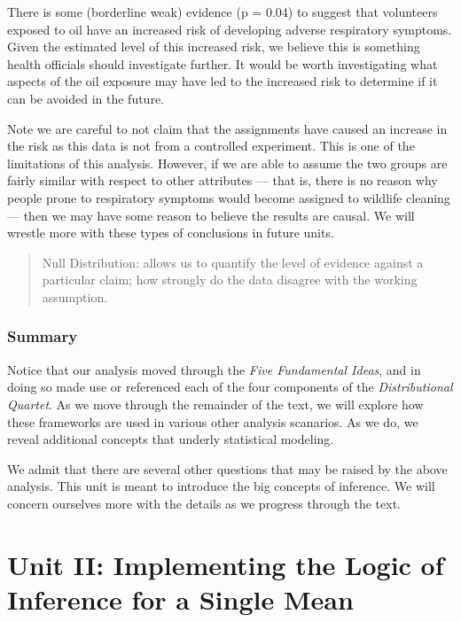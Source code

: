\documentclass[]{book}
\theoremstyle{plain}
\theoremstyle{mydefn}
\theoremstyle{myexmpl}
\theoremstyle{remark}
\begin{document}
There is some (borderline weak) evidence (p = 0.04) to suggest that
volunteers exposed to oil have an increased risk of developing adverse
respiratory symptoms. Given the estimated level of this increased risk,
we believe this is something health officials should investigate
further. It would be worth investigating what aspects of the oil
exposure may have led to the increased risk to determine if it can be
avoided in the future.

Note we are careful to not claim that the assignments have caused an
increase in the risk as this data is not from a controlled experiment.
This is one of the limitations of this analysis. However, if we are able
to assume the two groups are fairly similar with respect to other
attributes --- that is, there is no reason why people prone to
respiratory symptoms would become assigned to wildlife cleaning --- then
we may have some reason to believe the results are causal. We will
wrestle more with these types of conclusions in future units.

\begin{quote}
Null Distribution: allows us to quantify the level of evidence against a
particular claim; how strongly do the data disagree with the working
assumption.
\end{quote}

\section{Summary}\label{summary}

Notice that our analysis moved through the \emph{Five Fundamental
Ideas}, and in doing so made use or referenced each of the four
components of the \emph{Distributional Quartet}. As we move through the
remainder of the text, we will explore how these frameworks are used in
various other analysis scanarios. As we do, we reveal additional
concepts that underly statistical modeling.

We admit that there are several other questions that may be raised by
the above analysis. This unit is meant to introduce the big concepts of
inference. We will concern ourselves more with the details as we
progress through the text.

\part{Unit II: Implementing the Logic of Inference for a
Single
Mean}\label{part-unit-ii-implementing-the-logic-of-inference-for-a-single-mean}
\end{document}
